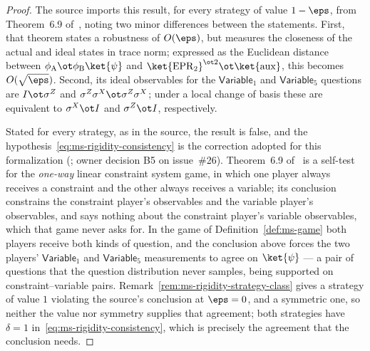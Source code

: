 \begin{proof}
	\leanok
	The source imports this result, for every strategy of value $1-\eps$, from Theorem~6.9 of~\cite{Coladangelo2017Robust}, noting two minor differences between the statements. First, that theorem states a robustness of $O(\eps)$, but measures the closeness of the actual and ideal states in trace norm; expressed as the Euclidean distance between $\phi_{\mathrm A} \ot \phi_{\mathrm B}\ket{\psi}$ and $\ket{\mathrm{EPR}_2}^{\ot 2} \ot \ket{\mathrm{aux}}$, this becomes $O(\sqrt\eps)$. Second, its ideal observables for the $\mathsf{Variable}_1$ and $\mathsf{Variable}_5$ questions are $I \ot \sigma^Z$ and $\sigma^Z\sigma^X \ot \sigma^Z\sigma^X$; under a local change of basis these are equivalent to $\sigma^X \ot I$ and $\sigma^Z \ot I$, respectively.

	Stated for every strategy, as in the source, the result is false, and the hypothesis~\eqref{eq:ms-rigidity-consistency} is the correction adopted for this formalization (\cite{gap:qpbt_ms-rigidity-symmetric-strategies}; owner decision B5 on issue~\#26). Theorem~6.9 of~\cite{Coladangelo2017Robust} is a self-test for the \emph{one-way} linear constraint system game, in which one player always receives a constraint and the other always receives a variable; its conclusion constrains the constraint player's observables and the variable player's observables, and says nothing about the constraint player's variable observables, which that game never asks for. In the game of Definition~\ref{def:ms-game} both players receive both kinds of question, and the conclusion above forces the two players' $\mathsf{Variable}_1$ and $\mathsf{Variable}_5$ measurements to agree on $\ket{\psi}$ --- a pair of questions that the question distribution never samples, being supported on constraint--variable pairs. Remark~\ref{rem:ms-rigidity-strategy-class} gives a strategy of value $1$ violating the source's conclusion at $\eps = 0$, and a symmetric one, so neither the value nor symmetry supplies that agreement; both strategies have $\delta = 1$ in~\eqref{eq:ms-rigidity-consistency}, which is precisely the agreement that the conclusion needs.


\end{proof}
